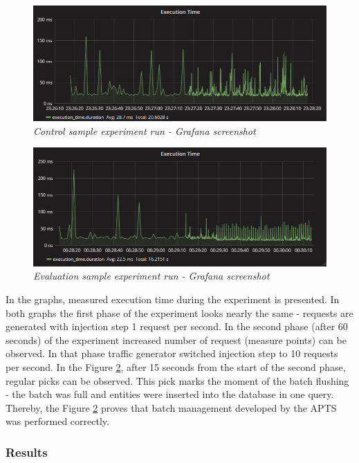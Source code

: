 \documentclass[12pt,a4paper]{article}
\begin{document}
\begin{figure}[!htb]
\centering
\includegraphics[width=1\textwidth]{batchCtrl}
\caption{\textit{Control sample experiment run - Grafana screenshot}} \label{batchevaluationscreencontrol}
\end{figure}
\begin{figure}[!htb]
\centering
\includegraphics[width=1\textwidth]{batchEval}
\caption{\textit{Evaluation sample experiment run - Grafana screenshot}} \label{batchevaluationscreenevaluation}
\end{figure}

In the graphs, measured execution time during the experiment is presented. In both graphs the first phase of the experiment looks nearly the same - requests are generated with injection step 1 request per second. In the second phase (after 60 seconds) of the experiment increased number of request (measure points) can be observed. In that phase traffic generator switched injection step to 10 requests per second. In the Figure \ref{batchevaluationscreenevaluation}, after 15 seconds from the start of the second phase, regular picks can be observed. This pick marks the moment of the batch flushing - the batch was full and entities were inserted into the database in one query. Thereby, the Figure \ref{batchevaluationscreenevaluation} proves that batch management developed by the APTS was performed correctly. 

\subsubsection{Results} \label{section:batchresults}
\end{document}
